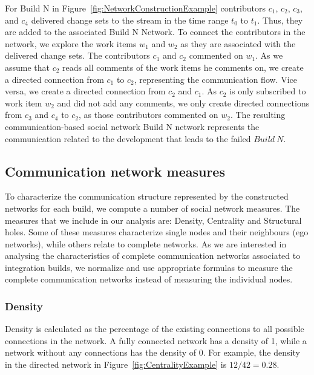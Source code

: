 \documentclass[12pt,oneside]{book}
\begin{document}
For Build N in Figure~\ref{fig:NetworkConstructionExample} contributors $c_1$,
$c_2$, $c_3$, and $c_4$ delivered change sets to the stream in the time range $t_0$
to $t_1$. Thus, they are added to the associated Build N Network. To connect the
contributors in the network, we explore the work items $w_1$ and $w_2$ as they
are associated with the delivered change sets. The contributors $c_1$ and $c_2$
commented on $w_1$. As we assume that $c_2$ reads all comments of the work items
he comments on, we create a directed connection from $c_1$ to $c_2$, representing
the communication flow. Vice versa, we create a directed connection from $c_2$
and $c_1$. As $c_2$ is only subscribed to work item $w_2$ and did not add any
comments, we only create directed connections from $c_3$ and $c_4$ to $c_2$, as
those contributors commented on $w_2$. The resulting communication-based social
network Build N network represents the communication related to the development
that leads to the failed $Build~N$.

\subsection{Communication network measures}
To characterize the communication structure represented by the constructed
networks for each build, we compute a number of social network measures. The
measures that we include in our analysis are: Density, Centrality and Structural
holes. Some of these measures characterize single nodes and their neighbours (ego
networks), while others relate to complete networks. As we are interested in
analysing the characteristics of complete communication networks associated to
integration builds, we normalize and use appropriate formulas to measure the
complete communication networks instead of measuring the individual nodes.


\subsubsection{Density}
Density is calculated as the percentage of the existing connections to all
possible connections in the network. A fully connected network has a density of
1, while a network without any connections has the density of 0. For example, the
density in the directed network in Figure~\ref{fig:CentralityExample} is
$12/42=0.28$.
\end{document}
